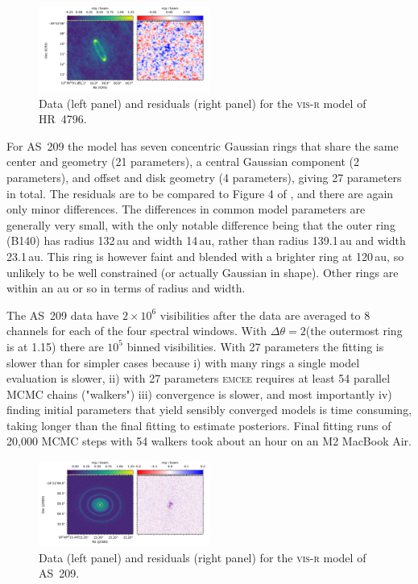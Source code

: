 \documentclass[fleqn,usenatbib]{rasti}
\begin{document}
\begin{figure}
    \centering
    \hspace{-0.5cm}\includegraphics[width=0.5\textwidth]{resid_hr4796.pdf}
    \caption{Data (left panel) and residuals (right panel) for the \textsc{vis-r} model of HR~4796.}
    \label{fig:hr4796resid}
\end{figure}

For AS~209 the model has seven concentric Gaussian rings that share the same center and geometry (21 parameters), a central Gaussian component (2 parameters), and offset and disk geometry (4 parameters), giving 27 parameters in total. The residuals are to be compared to Figure 4 of \citet{2018ApJ...869L..48G}, and there are again only minor differences. The differences in common model parameters are generally very small, with the only notable difference being that the outer ring (B140) has radius 132\,au and width 14\,au, rather than radius 139.1\,au and width 23.1\,au. This ring is however faint and blended with a brighter ring at 120\,au, so unlikely to be well constrained (or actually Gaussian in shape). Other rings are within an au or so in terms of radius and width.

The AS~209 data have $2 \times 10^6$ visibilities after the data are averaged to 8 channels for each of the four spectral windows. With $\Delta \theta = 2$\arcsec (the outermost ring is at 1.15\arcsec) there are $10^5$ binned visibilities. With 27 parameters the fitting is slower than for simpler cases because i) with many rings a single model evaluation is slower, ii) with 27 parameters \textsc{emcee} requires at least 54 parallel MCMC chains ("walkers") iii) convergence is slower, and most importantly iv) finding initial parameters that yield sensibly converged models is time consuming, taking longer than the final fitting to estimate posteriors. Final fitting runs of 20,000 MCMC steps with 54 walkers took about an hour on an M2 MacBook Air.

\begin{figure}
    \centering
    \hspace{-0.5cm}\includegraphics[width=0.5\textwidth]{resid_as209.pdf}
    \caption{Data (left panel) and residuals (right panel) for the \textsc{vis-r} model of AS~209.}
    \label{fig:as209resid}
\end{figure}
\end{document}
